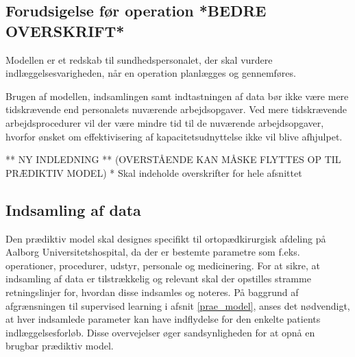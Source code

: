 \subsection{Forudsigelse før operation *BEDRE OVERSKRIFT*} 



Modellen er et redskab til sundhedspersonalet, der skal vurdere indlæggelsesvarigheden, når en operation planlægges og gennemføres.

Brugen af modellen, indsamlingen samt indtastningen af data bør ikke være mere tidskrævende end personalets nuværende arbejdsopgaver. Ved mere tidskrævende arbejdsprocedurer vil der være mindre tid til de nuværende arbejdsopgaver, hvorfor ønsket om effektivisering af kapacitetsudnyttelse ikke vil blive afhjulpet.

** NY INDLEDNING **  (OVERSTÅENDE KAN MÅSKE FLYTTES OP TIL PRÆDIKTIV MODEL)
* Skal indeholde overskrifter for hele afsnittet





\subsection{Indsamling af data}
Den prædiktiv model skal designes specifikt til ortopædkirurgisk afdeling på Aalborg Universitetshospital, da der er bestemte parametre som f.eks. operationer, procedurer, udstyr, personale og medicinering. For at sikre, at indsamling af data er tilstrækkelig og relevant skal der opstilles stramme retningslinjer for, hvordan disse indsamles og noteres. På baggrund af afgrænsningen til supervised learning i afsnit \ref{prae_model}, anses det nødvendigt, at hver indsamlede parameter kan have indflydelse for den enkelte patients indlæggelsesforløb. Disse overvejelser øger sandsynligheden for at opnå en brugbar prædiktiv model. 


